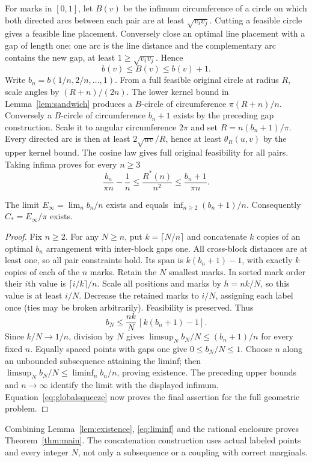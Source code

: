 \documentclass[review,supplement,hidelinks,onefignum,onetabnum]{siamart251216}
\newcommand{\Rstar}{R^*}
\begin{document}
For marks in $[0,1]$, let $B(v)$ be the infimum circumference of a circle
on which both directed arcs between each pair are at least
$\sqrt{v_iv_j}$. Cutting a feasible circle gives a feasible line
placement. Conversely close an optimal line placement with a gap of
length one: one arc is the line distance and the complementary arc
contains the new gap, at least $1\ge\sqrt{v_iv_j}$. Hence
\begin{equation}\label{eq:bB}
b(v)\le B(v)\le b(v)+1.
\end{equation}
Write $b_n=b(1/n,2/n,\ldots,1)$. From a full feasible original circle
at radius $R$, scale angles by $(R+n)/(2n)$. The lower kernel bound
in Lemma~\ref{lem:sandwich} produces a $B$-circle of circumference
$\pi(R+n)/n$. Conversely a $B$-circle of circumference $b_n+1$ exists
by the preceding gap construction. Scale it to angular circumference
$2\pi$ and set $R=n(b_n+1)/\pi$. Every directed arc is then at least
$2\sqrt{uv}/R$, hence at least $\theta_R(u,v)$ by the upper kernel
bound. The cosine law gives full original feasibility for all pairs.
Taking infima proves for every $n\ge3$
\begin{equation}\label{eq:globalsqueeze}
\frac{b_n}{\pi n}-\frac1n\le\frac{\Rstar(n)}{n^2}
\le\frac{b_n+1}{\pi n}.
\end{equation}

\begin{lemma}\label{lem:existence}
The limit $E_\infty=\lim_n b_n/n$ exists and equals
$\inf_{n\ge2}(b_n+1)/n$. Consequently $C_*=E_\infty/\pi$ exists.
\end{lemma}
\begin{proof}
Fix $n\ge2$. For any $N\ge n$, put $k=\lceil N/n\rceil$ and
concatenate $k$ copies of an optimal $b_n$ arrangement with inter-block
gaps one. All cross-block distances are at least one, so all pair
constraints hold. Its span is $k(b_n+1)-1$, with exactly $k$ copies
of each of the $n$ marks. Retain the $N$ smallest marks. In sorted
mark order their $i$th value is $\lceil i/k\rceil/n$.
Scale all positions and marks by $h=nk/N$, so this value is at least
$i/N$. Decrease the retained marks to $i/N$, assigning each label once
(ties may be broken arbitrarily). Feasibility is preserved. Thus
\[
b_N\le\frac{nk}{N}\,[k(b_n+1)-1].
\]
Since $k/N\to1/n$, division by $N$ gives
$\limsup_N b_N/N\le(b_n+1)/n$ for every fixed $n$.
Equally spaced points with gaps one give $0\le b_N/N\le1$.
Choose $n$ along an unbounded subsequence attaining the liminf; then
$\limsup_N b_N/N\le\liminf_n b_n/n$, proving existence.
The preceding upper bounds and $n\to\infty$ identify the limit with
the displayed infimum. Equation~\eqref{eq:globalsqueeze} now proves
the final assertion for the full geometric problem.
\end{proof}
Combining Lemma~\ref{lem:existence}, \eqref{eq:liminf} and the rational
enclosure proves Theorem~\ref{thm:main}. The concatenation construction
uses actual labeled points and every integer $N$, not only a subsequence
or a coupling with correct marginals.
\end{document}

